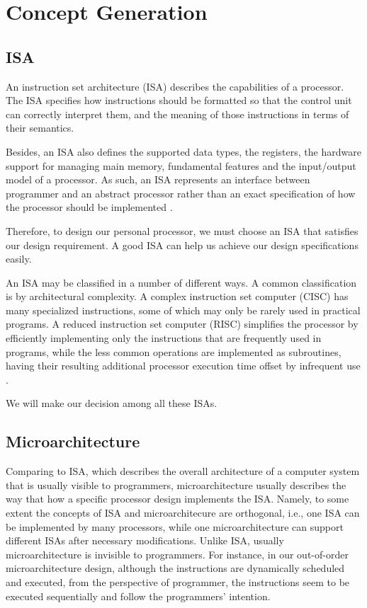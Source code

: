
\let\clearpage\relax
\chapter{Concept Generation}

\section{ISA} %
An instruction set architecture (ISA) describes the capabilities of a processor. The ISA specifies how instructions should be formatted so that the control unit can correctly interpret them, and the meaning of those instructions in terms of their semantics.

Besides, an ISA also defines the supported data types, the registers, the hardware support for managing main memory, fundamental features and the input/output model of a processor. As such, an ISA represents an interface between programmer and an abstract processor rather than an exact specification of how the processor should be implemented \cite{Daniel}.

Therefore, to design our personal processor, we must choose an ISA that satisfies our design requirement. A good ISA can help us achieve our design specifications easily.

An ISA may be classified in a number of different ways. A common classification is by architectural complexity. A complex instruction set computer (CISC) has many specialized instructions, some of which may only be rarely used in practical programs. A reduced instruction set computer (RISC) simplifies the processor by efficiently implementing only the instructions that are frequently used in programs, while the less common operations are implemented as subroutines, having their resulting additional processor execution time offset by infrequent use \cite{risc_cisc}.

We will make our decision among all these ISAs.

\section{Microarchitecture} %
Comparing to ISA, which describes the overall architecture of a computer system that is usually visible to programmers, microarchitecture usually describes the way that how a specific processor design implements the ISA. Namely, to some extent the concepts of ISA and microarchitecure are orthogonal, i.e., one ISA can be implemented by many processors, while one microarchitecture can support different ISAs after necessary modifications. Unlike ISA, usually microarchitecture is invisible to programmers. For instance, in our out-of-order microarchitecture design, although the instructions are dynamically scheduled and executed, from the perspective of programmer, the instructions seem to be executed sequentially and follow the programmers' intention.


